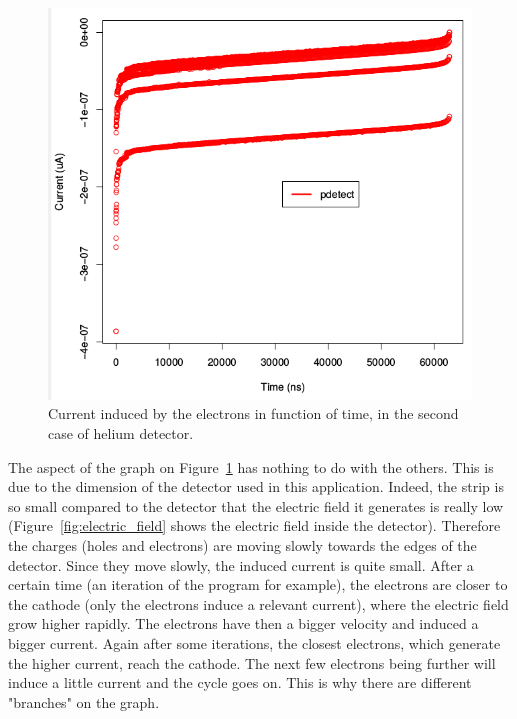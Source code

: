 \documentclass[11pt]{article}
\begin{document}
				\begin{figure}[H]
				  \center
				  \includegraphics[scale=0.4]{images/applications/helium2_precise.png}
				  \caption{Current induced by the electrons in function of time, in the second case of helium detector.}
				  \label{fig:helium2_precise}
				\end{figure}

				The aspect of the graph on Figure~\ref{fig:helium2_precise} has nothing to do with the others. This is due
				to the dimension of the detector used in this application. Indeed, the strip is so small compared to the
				detector that the electric field it generates is really low (Figure~\ref{fig:electric_field} shows the electric
				field inside the detector). Therefore the charges (holes and electrons) are moving slowly towards the edges of
				the detector. Since they move slowly, the induced current is quite small. After a certain time (an iteration
				of the program for example), the electrons are closer to the cathode (only the electrons induce a relevant current),
				where the electric field grow higher rapidly. The electrons have then a bigger velocity and induced a bigger
				current. Again after some iterations, the closest electrons, which generate the higher current, reach the cathode.
				The next few electrons being further will induce a little current and the cycle goes on. This is why there are
				different "branches" on the graph.
\end{document}
